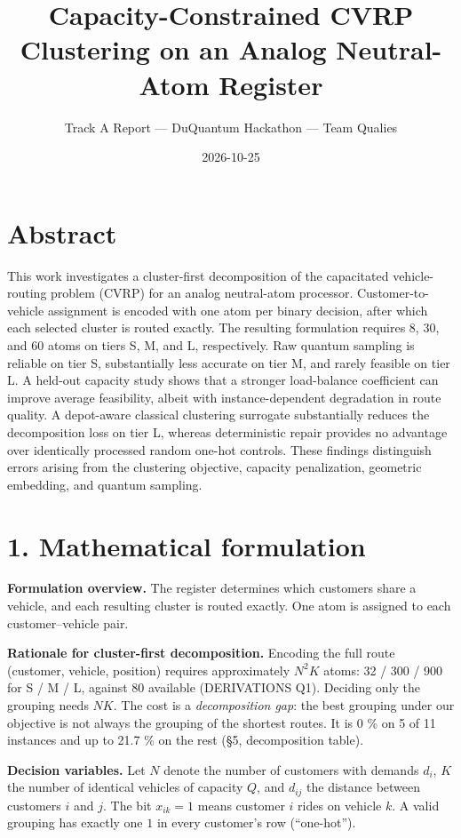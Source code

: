 \documentclass[9pt,a4paper]{extarticle}
\title{Capacity-Constrained CVRP Clustering on an Analog Neutral-Atom Register}
\author{Track A Report — DuQuantum Hackathon — Team Qualies}
\date{2026-10-25}
\begin{document}
\maketitle
\vspace{-1.8em}
\section{Abstract}\label{abstract}

This work investigates a cluster-first decomposition of the capacitated
vehicle-routing problem (CVRP) for an analog neutral-atom processor.
Customer-to-vehicle assignment is encoded with one atom per binary
decision, after which each selected cluster is routed exactly. The
resulting formulation requires 8, 30, and 60 atoms on tiers S, M, and L,
respectively. Raw quantum sampling is reliable on tier S, substantially
less accurate on tier M, and rarely feasible on tier L. A held-out
capacity study shows that a stronger load-balance coefficient can
improve average feasibility, albeit with instance-dependent degradation
in route quality. A depot-aware classical clustering surrogate
substantially reduces the decomposition loss on tier L, whereas
deterministic repair provides no advantage over identically processed
random one-hot controls. These findings distinguish errors arising from
the clustering objective, capacity penalization, geometric embedding,
and quantum sampling.

\section{1. Mathematical formulation}\label{mathematical-formulation}

\textbf{Formulation overview.} The register determines which customers
share a vehicle, and each resulting cluster is routed exactly. One atom
is assigned to each customer--vehicle pair.

\textbf{Rationale for cluster-first decomposition.} Encoding the full
route (customer, vehicle, position) requires approximately \(N^2K\)
atoms: 32 / 300 / 900 for S / M / L, against 80 available (DERIVATIONS
Q1). Deciding only the grouping needs \(NK\). The cost is a
\emph{decomposition gap}: the best grouping under our objective is not
always the grouping of the shortest routes. It is 0 \% on 5 of 11
instances and up to 21.7 \% on the rest (§5, decomposition table).

\textbf{Decision variables.} Let \(N\) denote the number of customers
with demands \(d_i\), \(K\) the number of identical vehicles of capacity
\(Q\), and \(d_{ij}\) the distance between customers \(i\) and \(j\).
The bit \(x_{ik}=1\) means customer \(i\) rides on vehicle \(k\). A
valid grouping has exactly one \(1\) in every customer's row
(``one-hot'').
\end{document}
